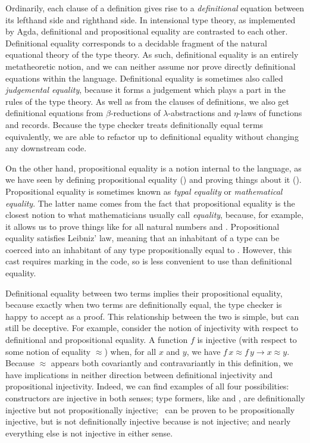 Ordinarily, each clause of a definition gives rise to a \emph{definitional}
equation between its lefthand side and righthand side.
In intensional type theory, as implemented by Agda, definitional and
propositional equality are contrasted to each other.
Definitional equality corresponds to a decidable fragment of the natural
equational theory of the type theory.
As such, definitional equality is an entirely metatheoretic notion, and we can
neither assume nor prove directly definitional equations within the language.
Definitional equality is sometimes also called \emph{judgemental equality},
because it forms a judgement which plays a part in the rules of the type theory.
As well as from the clauses of definitions, we also get definitional equations
from $\beta$-reductions of $\lambda$-abstractions and $\eta$-laws of functions
and records.
Because the type checker treats definitionally equal terms equivalently, we are
able to refactor up to definitional equality without changing any downstream
code.

On the other hand, propositional equality is a notion internal to the language,
as we have seen by defining propositional equality (\AgdaDatatype{\_$\equiv$\_})
and proving things about it ().
Propositional equality is sometimes known as \emph{typal equality} or
\emph{mathematical equality}.
The latter name comes from the fact that propositional equality is the closest
notion to what mathematicians usually call \emph{equality}, because, for
example, it allows us to prove things like
\AgdaSpace{}\AgdaFunction{+}\AgdaSpace{}%
\AgdaSpace{}\AgdaDatatype{$\equiv$}\AgdaSpace{}%
\AgdaSpace{}\AgdaFunction{+}\AgdaSpace{} for all
natural numbers  and .
Propositional equality satisfies Leibniz' law, meaning that an inhabitant of a
type  can be coerced into an inhabitant of any type propositionally
equal to .
However, this cast requires marking in the code, so is less convenient to use
than definitional equality.

Definitional equality between two terms implies their propositional equality,
because exactly when two terms are definitionally equal, the type checker is
happy to accept  as a proof.
This relationship between the two is simple, but can still be deceptive.
For example, consider the notion of injectivity with respect to definitional
and propositional equality.
A function $f$ is injective (with respect to some notion of equality $\approx$)
when, for all $x$ and $y$, we have $f\,x \approx f\,y \to x \approx y$.
Because $\approx$ appears both covariantly and contravariantly in this
definition, we have implications in neither direction between definitional
injectivity and propositional injectivity.
Indeed, we can find examples of all four possibilities:
constructors are injective in both senses; type formers, like 
and , are definitionally injective but not propositionally
injective;
\ can be proven to be
propositionally injective, but is not definitionally injective because
\AgdaFunction{\_+\_} is not injective;
and nearly everything else is not injective in either sense.

